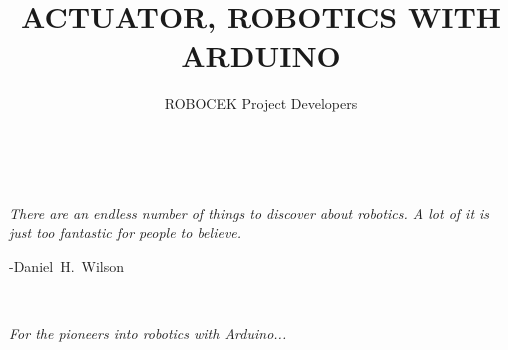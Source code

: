 \documentclass[oneside,openany]{tufte-book} %
\title{ACTUATOR, ROBOTICS WITH ARDUINO} %
\author{ROBOCEK Project Developers} %
\begin{document}
\frontmatter


\maketitle



\clearpage
~\vfill
\begin{fullwidth}
    \noindent\fontsize{18}{22}\selectfont\itshape \nohyphenation
    There are an endless number of things to discover about robotics. A lot of it is just too fantastic for people to believe.
    \par \begin{flushright} \mbox{-Daniel H. Wilson} \end{flushright} 
    \vfill \vfill
\end{fullwidth}







\newpage
~\vfill
\begin{fullwidth}
	\noindent\fontsize{18}{22}\selectfont\itshape \nohyphenation    
	\centering
	For the pioneers into robotics with Arduino...
	\vfill \vfill
\end{fullwidth}
\end{document}
